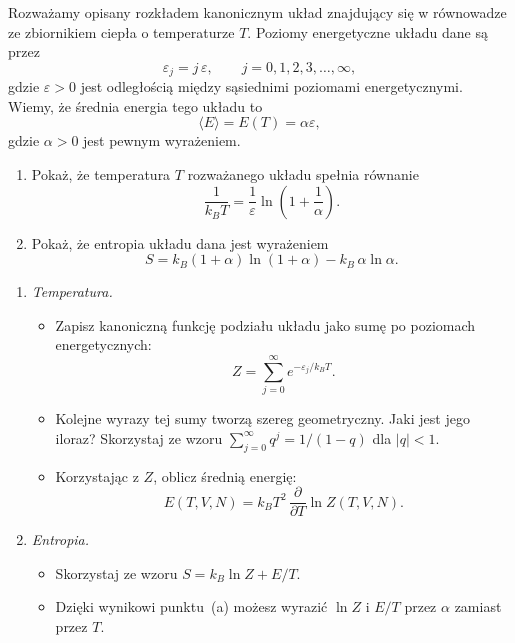 
Rozważamy opisany rozkładem kanonicznym układ znajdujący się w równowadze ze
zbiornikiem ciepła o temperaturze $T$. Poziomy energetyczne układu dane są przez
\begin{equation*}
  \varepsilon_j = j\,\varepsilon, \qquad j = 0, 1, 2, 3, \ldots, \infty ,
\end{equation*}
gdzie $\varepsilon > 0$ jest odległością między sąsiednimi poziomami
energetycznymi. Wiemy, że średnia energia tego układu to
\begin{equation*}
  \langle E \rangle = E(T) = \alpha\varepsilon ,
\end{equation*}
gdzie $\alpha > 0$ jest pewnym wyrażeniem.

\begin{enumerate}[label=(\alph*)]
  \item Pokaż, że temperatura $T$ rozważanego układu spełnia równanie
    \begin{equation*}
      \frac{1}{k_B T} = \frac{1}{\varepsilon}\ln\left(1 + \frac{1}{\alpha}\right).
    \end{equation*}
  \item Pokaż, że entropia układu dana jest wyrażeniem
    \begin{equation*}
      S = k_B(1 + \alpha)\ln(1 + \alpha) - k_B\,\alpha\ln\alpha .
    \end{equation*}
\end{enumerate}

\begin{wskazowki}
\begin{enumerate}[label=(\alph*)]
  \item \textit{Temperatura.}
    \begin{itemize}
      \item Zapisz kanoniczną funkcję podziału układu jako sumę po poziomach
        energetycznych:
        \begin{equation*}
          Z = \sum_{j=0}^{\infty} e^{-\varepsilon_j/k_BT} .
        \end{equation*}
      \item Kolejne wyrazy tej sumy tworzą szereg geometryczny. Jaki jest jego
        iloraz? Skorzystaj ze wzoru
        $\sum_{j=0}^{\infty} q^j = 1/(1 - q)$ dla $|q| < 1$.
      \item Korzystając z $Z$, oblicz średnią energię:
        \begin{equation*}
          E(T,V,N) = k_BT^2\,\frac{\partial}{\partial T}\ln Z(T,V,N) .
        \end{equation*}
    \end{itemize}
  \item \textit{Entropia.}
    \begin{itemize}
      \item Skorzystaj ze wzoru $S = k_B\ln Z + E/T$.
      \item Dzięki wynikowi punktu~(a) możesz wyrazić $\ln Z$ i $E/T$
        przez $\alpha$ zamiast przez $T$.
    \end{itemize}
\end{enumerate}
\end{wskazowki}
